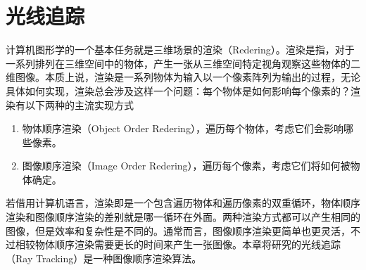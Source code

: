 \chapter{光线追踪}

计算机图形学的一个基本任务就是三维场景的渲染（Redering）。渲染是指，对于一系列排列在三维空间中的物体，产生一张从三维空间特定视角观察这些物体的二维图像。本质上说，渲染是一系列物体为输入以一个像素阵列为输出的过程，无论具体如何实现，渲染总会涉及这样一个问题：每个物体是如何影响每个像素的？渲染有以下两种的主流实现方式
\begin{enumerate}
    \item 物体顺序渲染（Object Order Redering），遍历每个物体，考虑它们会影响哪些像素。
    \item 图像顺序渲染（Image Order Redering），遍历每个像素，考虑它们将如何被物体确定。
\end{enumerate}
若借用计算机语言，渲染即是一个包含遍历物体和遍历像素的双重循环，物体顺序渲染和图像顺序渲染的差别就是哪一循环在外面。两种渲染方式都可以产生相同的图像，但是效率和复杂性是不同的。通常而言，图像顺序渲染更简单也更灵活，不过相较物体顺序渲染需要更长的时间来产生一张图像。本章将研究的光线追踪（Ray Tracking）是一种图像顺序渲染算法。



